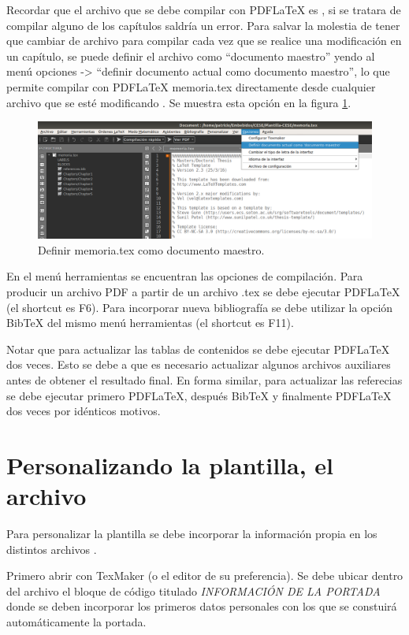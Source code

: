 Recordar que el archivo que se debe compilar con PDFLaTeX es , si se tratara de compilar alguno de los capítulos saldría un error.  Para salvar la molestia de tener que cambiar de archivo para compilar cada vez que se realice una modificación en un capítulo, se puede definir el archivo  como ``documento maestro'' yendo al menú opciones -> ``definir documento actual como documento maestro'', lo que permite compilar con PDFLaTeX memoria.tex directamente desde cualquier archivo que se esté modificando . Se muestra esta opción en la figura \ref{fig:docMaestro}.

\begin{figure}[h]
	\centering
	\includegraphics[width=\textwidth]{./Figures/docMaestro.png}
	\caption{Definir memoria.tex como documento maestro.}
	\label{fig:docMaestro}
\end{figure}

En el menú herramientas se encuentran las opciones de compilación.  Para producir un archivo PDF a partir de un archivo .tex se debe ejecutar PDFLaTeX (el shortcut es F6). Para incorporar nueva bibliografía se debe utilizar la opción BibTeX del mismo menú herramientas (el shortcut es F11).

Notar que para actualizar las tablas de contenidos se debe ejecutar PDFLaTeX dos veces.  Esto se debe a que es necesario actualizar algunos archivos auxiliares antes de obtener el resultado final.  En forma similar, para actualizar las referecias se debe ejecutar primero PDFLaTeX, después BibTeX y finalmente PDFLaTeX dos veces por idénticos motivos.

\section{Personalizando la plantilla, el archivo }
\label{sec:FillingFile}

Para personalizar la plantilla se debe incorporar la información propia en los distintos archivos . 

Primero abrir  con TexMaker (o el editor de su preferencia). Se debe ubicar dentro del archivo el bloque de código titulado \emph{INFORMACIÓN DE LA PORTADA} donde se deben incorporar los primeros datos personales con los que se constuirá automáticamente la portada.


